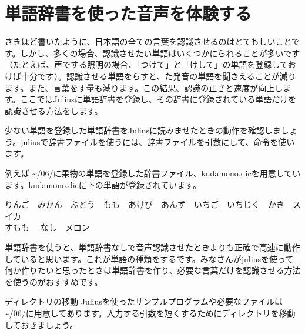\newpage
\section{単語辞書を使った音声を体験する}
さきほど書いたように、日本語の全ての言葉を認識させるのはとてもしいことです。しかし、多くの場合、認識させたい単語はいくつかにられることが多いです（たとえば、声でする照明の場合、「つけて」と「けして」の単語を登録しておけば十分です）。認識させる単語をらすと、た発音の単語を聞きえることが減ります。また、言葉をす量も減ります。この結果、認識の正さと速度が向上します。ここではJuliusに単語辞書を登録し、その辞書に登録されている単語だけを認識させる方法をします。

少ない単語を登録した単語辞書をJuliusに読みませたときの動作を確認しましょう。juliusで辞書ファイルを使うには、辞書ファイルを引数にして、命令を使います。\\

例えば \textasciitilde /06/に果物の単語を登録した辞書ファイル、kudamono.dicを用意しています。kudamono.dicに下の単語が登録されています。
\begin{center}
	りんご　みかん　ぶどう　もも　あけび　あんず　いちご　いちじく　かき　スイカ\\すもも　	なし　メロン
\end{center}

単語辞書を使うと、単語辞書なしで音声認識させたときよりも正確で高速に動作していると思います。これが単語の種類をするです。みなさんがjuliusを使って何か作りたいと思ったときは単語辞書を作り、必要な言葉だけを認識させる方法を使うのがおすすめです。\\

\begin{itembox}[c]{ディレクトリの移動}
        Juliusを使ったサンプルプログラムや必要なファイルは \textasciitilde /06/に用意してあります。入力する引数を短くするためにディレクトリを移動しておきましょう。\\
\end{itembox}

\begin{tcolorbox}[title=\useOmetoi]
\begin{enumerate}
\end{enumerate}
\end{tcolorbox}

